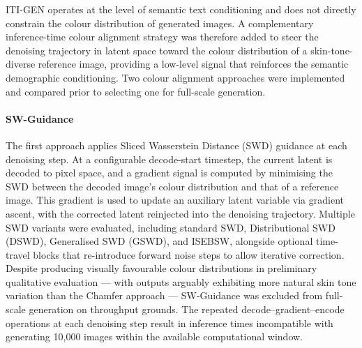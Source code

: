ITI-GEN operates at the level of semantic text conditioning 
and does not directly constrain the colour distribution of 
generated images. A complementary inference-time colour 
alignment strategy was therefore added to steer the 
denoising trajectory in latent space toward the colour 
distribution of a skin-tone-diverse reference image, 
providing a low-level signal that reinforces the semantic 
demographic conditioning. Two colour alignment approaches 
were implemented and compared prior to selecting one for 
full-scale generation.

\paragraph{SW-Guidance}
The first approach applies Sliced Wasserstein Distance 
(SWD) guidance at each denoising step. At a configurable 
decode-start timestep, the current latent is decoded to 
pixel space, and a gradient signal is computed by 
minimising the SWD between the decoded image's colour 
distribution and that of a reference image. This gradient 
is used to update an auxiliary latent variable via gradient 
ascent, with the corrected latent reinjected into the 
denoising trajectory. Multiple SWD variants were evaluated, 
including standard SWD, Distributional SWD (DSWD), 
Generalised SWD (GSWD), and ISEBSW, alongside optional 
time-travel blocks that re-introduce forward noise steps 
to allow iterative correction. Despite producing visually 
favourable colour distributions in preliminary qualitative 
evaluation --- with outputs arguably exhibiting more 
natural skin tone variation than the Chamfer approach --- 
SW-Guidance was excluded from full-scale generation on 
throughput grounds. The repeated decode--gradient--encode 
operations at each denoising step result in inference 
times incompatible with generating 10{,}000 images within 
the available computational window.

